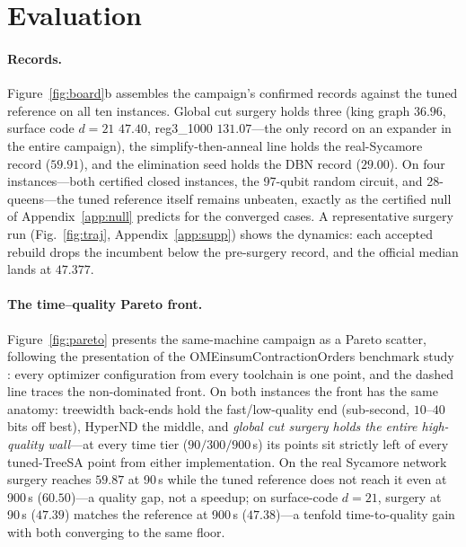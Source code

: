 \documentclass{SciPost}
\begin{document}
\section{Evaluation}
\label{sec:eval}

\paragraph{Records.}
Figure~\ref{fig:board}b assembles the campaign's confirmed records against
the tuned reference on all ten instances. Global cut surgery holds three
(king graph $36.96$, surface code $d{=}21$ $47.40$, reg3\_1000
$131.07$---the only record on an expander in the entire campaign), the
simplify-then-anneal line holds the real-Sycamore record ($59.91$), and
the elimination seed holds the DBN record ($29.00$). On four
instances---both certified closed instances, the 97-qubit random
circuit, and 28-queens---the tuned reference itself remains unbeaten,
exactly as the certified null of Appendix~\ref{app:null} predicts for the
converged cases. A representative surgery run
(Fig.~\ref{fig:traj}, Appendix~\ref{app:supp}) shows the dynamics:
each accepted rebuild drops the incumbent below the pre-surgery
record, and the official median lands at $47.377$.

\paragraph{The time--quality Pareto front.}
Figure~\ref{fig:pareto} presents the same-machine campaign as a Pareto
scatter, following the presentation of the OMEinsumContractionOrders
benchmark study \cite{liu_2025_omeco_orders}: every optimizer
configuration from every toolchain is one point, and the dashed line
traces the non-dominated front. On both instances the front has the same
anatomy: treewidth back-ends hold the fast/low-quality end (sub-second,
$10$--$40$ bits off best), HyperND the middle, and \emph{global cut
surgery holds the entire high-quality wall}---at every time tier
($90/300/900$\,s) its points sit strictly left of every tuned-TreeSA
point from either implementation. On the real Sycamore network surgery
reaches $59.87$ at 90\,s while the tuned reference does not reach it
even at 900\,s ($60.50$)---a quality gap, not a speedup; on surface-code
$d{=}21$, surgery at 90\,s ($47.39$) matches the reference at 900\,s
($47.38$)---a tenfold time-to-quality gain with both converging to the
same floor.
\end{document}
